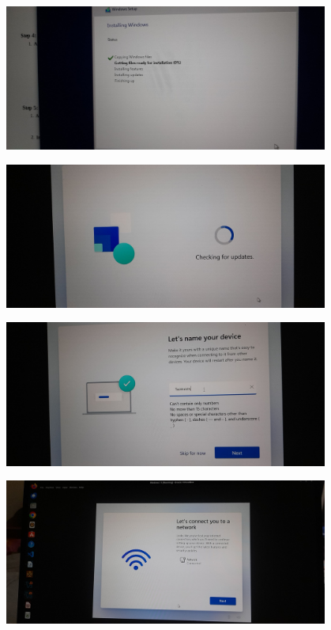 \documentclass[a4paper]{article}
\begin{document}
\begin{center}
    \includegraphics[width=0.8\textwidth]{18.jpeg} %
\end{center}
\begin{center}
    \includegraphics[width=0.8\textwidth]{19.jpeg} %
\end{center}
\begin{center}
    \includegraphics[width=0.8\textwidth]{20.jpeg} %
\end{center}
\begin{center}
    \includegraphics[width=0.8\textwidth]{21.jpeg} %
\end{center}
\end{document}
